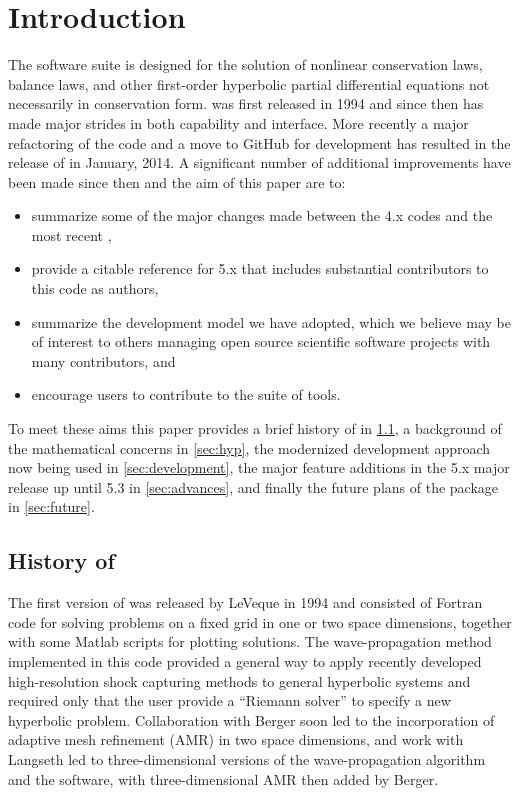 %
%
%

\section{Introduction}\label{sec:intro}

The \clawpack software suite \cite{clawpack} is designed for the solution of
nonlinear conservation laws, balance laws, and other first-order hyperbolic
partial differential equations not necessarily in conservation form.  \clawpack
was first released in 1994 and since then has made major strides in both
capability and interface. More recently a major refactoring of the code and a
move to GitHub for development has resulted in the release of
 in January, 2014. A significant number of additional improvements
have been made since then and the aim of this paper are to:
\begin{itemize}
\item summarize some of the major changes made between the \clawpack
4.x codes and the most recent ,
\item provide a citable reference for \clawpack 5.x that includes
substantial contributors to this code as authors,
\item summarize the development model we have adopted, which we believe
may be of interest to others managing open source scientific software
projects with many contributors, and
\item encourage users to contribute to the \clawpack suite of tools.
\end{itemize}
To meet these aims this paper provides a brief history of \clawpack in 
\ref{sub:history}, a background of the mathematical concerns in \ref{sec:hyp},
the modernized development approach now being used in \ref{sec:development}, the
major feature additions in the \clawpack 5.x major release up until 5.3 in
\ref{sec:advances}, and finally the future plans of the package in 
\ref{sec:future}.

\subsection{History of \clawpack} \label{sub:history}

The first version of \clawpack was released by LeVeque in 1994
\cite{clawpack-v1} and consisted of Fortran code for solving problems on a
fixed grid in one or two space dimensions, together with some Matlab scripts
for plotting solutions. The wave-propagation method implemented
in this code provided a general way to apply recently developed
high-resolution shock capturing methods to general hyperbolic systems and
required only that the user provide a ``Riemann solver'' to specify a new
hyperbolic problem.
Collaboration with Berger \cite{mjb-rjl:amrclaw}
soon led to the incorporation of adaptive mesh refinement (AMR) in two space
dimensions, and work with Langseth \cite{jol-rjl:3d, jol:thesis}
led to three-dimensional versions of the wave-propagation algorithm and the
software, with three-dimensional AMR then added by Berger.


